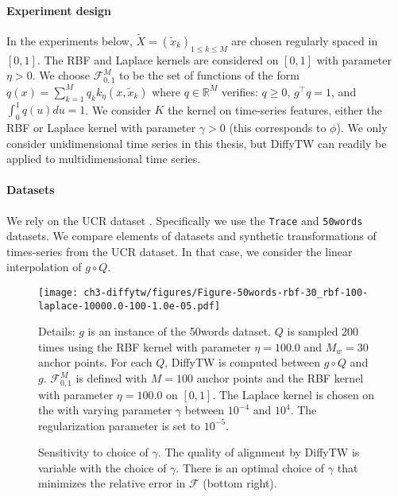 \paragraph{Experiment design}
In the experiments below, $\tilde X = (\tilde x_k)_{1\leq k \leq M}$ are chosen regularly spaced in $[0,1]$. The RBF and Laplace kernels are considered on $[0,1]$ with parameter $\eta >0$. We choose $\mathcal F_{0,1}^M$ to be the set of functions of the form $q(x) = \sum_{k=1}^Mq_k k_\eta(x, \tilde x_k)$ where $q\in\mathbb R^M$ verifies: $q \geq 0$, $g^\top q =1$, and $\int_0^1 q(u)du =1$.
We consider $K$ the kernel on time-series features, either the RBF or Laplace kernel with parameter $\gamma> 0$ (this corresponds to $\phi$). We only consider unidimensional time series in this thesis, but DiffyTW can readily be applied to multidimensional time series.

\paragraph{Datasets} We rely on the UCR dataset \citep{ucr}. Specifically we use the \texttt{Trace} and \texttt{50words} datasets. We compare elements of datasets and synthetic transformations of times-series from the UCR dataset. In that case, we consider the linear interpolation of $g \circ Q$.

\begin{figure}[ht!]
\begin{center}
\texttt{[image: ch3-diffytw/figures/Figure-50words-rbf-30\_rbf-100-laplace-10000.0-100-1.0e-05.pdf]}
\end{center}
\caption[Sensitivity to choice of $\gamma$]{Sensitivity to choice of $\gamma$. The quality of alignment by DiffyTW is variable with the choice of $\gamma$. There is an optimal choice of $\gamma$ that minimizes the relative error in $\mathcal F$ (bottom right).}
\small Details: $g$ is an instance of the 50words dataset.
$Q$ is sampled 200 times using the RBF kernel with parameter $\eta=100.0$ and $M_w=30$ anchor points.
For each $Q$, DiffyTW is computed between $g\circ Q$ and $g$.
$\mathcal F_{0,1}^M$ is defined with $M=100$ anchor points and the RBF kernel with parameter $\eta=100.0$ on $[0,1]$.
The Laplace kernel is chosen on the with varying parameter $\gamma$ between $10^{-4}$ and $10^{4}$.
The regularization parameter is set to $10^{-5}$.
\label{fig:gamma-sensitivity-50words}
\end{figure}


